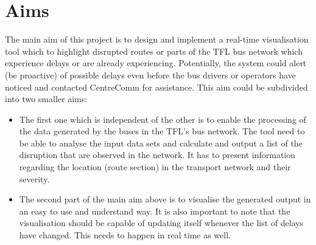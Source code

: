 \section{Aims}
The main aim of this project is to design and implement a real-time visualisation tool which to highlight disrupted routes or parts of the TFL bus network which experience delays or are already experiencing. Potentially, the system could alert (be proactive) of possible delays even before the bus drivers or operators have noticed and contacted CentreComm for assistance. This aim could be subdivided into two smaller aims:
\begin{itemize}
	\item The first one which is independent of the other is to enable the processing of the data generated by the buses in the TFL's bus network. The tool need to be able to analyse the input data sets and calculate and output a list of the disruption that are observed in the network. It has to present information regarding the location (route section) in the transport network and their severity.
	\item The second part of the main aim above is to visualise the generated output in an easy to use and understand way. It is also important to note that the visualisation should be capable of updating itself whenever the list of delays have changed. This needs to happen in real time as well.
\end{itemize}

